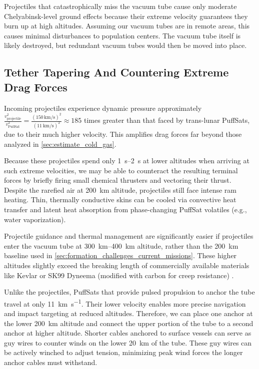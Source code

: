 \documentclass{article}
\begin{document}
Projectiles that catastrophically miss the vacuum tube cause only moderate Chelyabinsk-level \cite{popova2021chelyabinsk} ground effects because their extreme velocity guarantees they burn up at high altitudes.   Assuming our vacuum tubes are in remote areas, this causes minimal disturbances to population centers.   The vacuum tube itself is likely destroyed, but redundant vacuum tubes would then be moved into place.

\subsection{Tether Tapering And Countering Extreme Drag Forces}

Incoming projectiles experience dynamic pressure approximately  $\frac{v_{\text{projectile}}^2}{v_{\text{PuffSat}}^2} = \frac{(150\,\text{km/s})^2}{(11\,\text{km/s})^2} \approx 185$ times greater than that faced by trans-lunar PuffSats, due to their much higher velocity. This amplifies drag forces far beyond those analyzed in \autoref{sec:estimate_cold_gas}.

Because these projectiles spend only \SIrange{1}{2}{\second} at lower altitudes when arriving at such extreme velocities, we may be able to counteract the resulting terminal forces by briefly firing small chemical thrusters and vectoring their thrust. Despite the rarefied air at \SI{200}{\kilo\meter} altitude, projectiles still face intense ram heating. Thin, thermally conductive skins can be cooled via convective heat transfer and latent heat absorption from phase-changing PuffSat volatiles (e.g., water vaporization).

Projectile guidance and thermal management are significantly easier if projectiles enter the vacuum tube at \SIrange{300}{400}{\kilo\meter} altitude, rather than the \SI{200}{\kilo\meter} baseline used in \autoref{sec:formation_challenges_current_missions}. These higher altitudes slightly exceed the breaking length of commercially available materials like Kevlar or SK99 Dyneema (modified with carbon for creep resistance) \cite{wiki:specific_strength, sk99_tension}.

Unlike the projectiles, PuffSats that provide pulsed propulsion to anchor the tube travel at only \SI{11}{\kilo\meter\per\second}. Their lower velocity enables more precise navigation and impact targeting at reduced altitudes. Therefore, we can place one anchor at the lower \SI{200}{\kilo\meter} altitude and connect the upper portion of the tube to a second anchor at higher altitude. Shorter cables anchored to surface vessels can serve as guy wires to counter winds on the lower \SI{20}{\kilo\meter} of the tube. These guy wires can be actively winched to adjust tension, minimizing peak wind forces the longer anchor cables must withstand.
\end{document}
